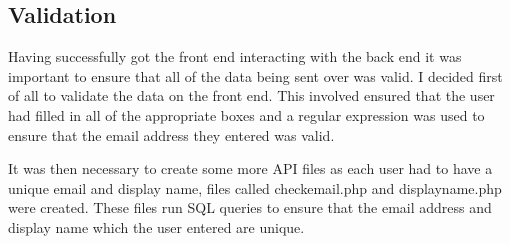 \subsection{Validation}
Having successfully got the front end interacting with the back end it was important to ensure that all of the data being sent over was valid. I decided first of all to validate the data on the front end. This involved ensured that the user had filled in all of the appropriate boxes and a regular expression was used to ensure that the email address they entered was valid.

It was then necessary to create some more API files as each user had to have a unique email and display name, files called checkemail.php and displayname.php were created. These files run SQL queries to ensure that the email address and display name which the user entered are unique.

